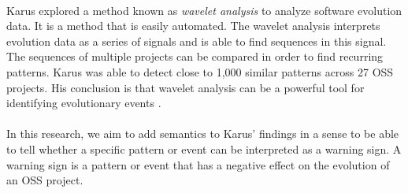 \paragraph{}
Karus explored a method known as \emph{wavelet analysis }\rm to analyze software
evolution data. It is a method that is easily automated. The wavelet analysis
interprets evolution data as a series of signals and is able to find sequences
in this signal. The sequences of multiple projects can be compared in order to
find recurring patterns. Karus was able to detect close to 1,000 similar
patterns across 27 OSS projects. His conclusion is that wavelet analysis
can be a powerful tool for identifying evolutionary events \cite{karus2013}.

\paragraph{}
In this research, we aim to add semantics to Karus' findings in a sense to be
able to tell whether a specific pattern or event can be interpreted as a
warning sign. A warning sign is a pattern or event that has a negative effect
on the evolution of an OSS project.

\begin{comment}
This chapter contains all the information needed to put the thesis into
context. It is common to use (a revised version) of your literature survey for
this purpose.
It is important to refer from your text to sources you have used, as listed in
your bibliography section (appendix). For example, “XP is a recent agile
development method [1]” is a common style of doing this, where the following
entry would be included in your bibliography:
[1] K. Beck, E. Gamma, Test infected: Programmers love writing tests, Java
Report 3 (7) (1998) 51–56.
If you want to refer to books you have read as part of the curriculum, you can
also do so in this way.
Have a look at Chapter 2 of this example thesis at Paul’s
homepage\footnote{http://homepages.cwi.nl/~paulk/thesesMasterSoftwareEngineering/2006/RichardKettelerij.pdf}.
\end{comment}